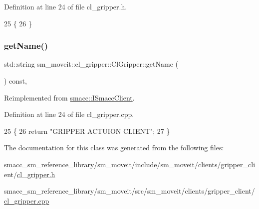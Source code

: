 Definition at line 24 of file cl\+\_\+gripper.\+h.


\begin{DoxyCode}
25   \{
26   \}
\end{DoxyCode}
\mbox{\label{classsm__moveit_1_1cl__gripper_1_1ClGripper_a71ee172824d9eb24c9a386ea6d8822ea}} 
\subsubsection{\texorpdfstring{get\+Name()}{getName()}}
{\footnotesize\ttfamily std\+::string sm\+\_\+moveit\+::cl\+\_\+gripper\+::\+Cl\+Gripper\+::get\+Name (\begin{DoxyParamCaption}{ }\end{DoxyParamCaption}) const\hspace{0.3cm}{\ttfamily [override]}, {\ttfamily [virtual]}}



Reimplemented from \hyperlink{classsmacc_1_1ISmaccClient_a8c3ce19f182e71909c5dc6263d25be69}{smacc\+::\+I\+Smacc\+Client}.



Definition at line 24 of file cl\+\_\+gripper.\+cpp.


\begin{DoxyCode}
25 \{
26     \textcolor{keywordflow}{return} \textcolor{stringliteral}{"GRIPPER ACTUION CLIENT"};
27 \}
\end{DoxyCode}


The documentation for this class was generated from the following files\+:\begin{DoxyCompactItemize}
\item 
smacc\+\_\+sm\+\_\+reference\+\_\+library/sm\+\_\+moveit/include/sm\+\_\+moveit/clients/gripper\+\_\+client/\hyperlink{cl__gripper_8h}{cl\+\_\+gripper.\+h}\item 
smacc\+\_\+sm\+\_\+reference\+\_\+library/sm\+\_\+moveit/src/sm\+\_\+moveit/clients/gripper\+\_\+client/\hyperlink{cl__gripper_8cpp}{cl\+\_\+gripper.\+cpp}\end{DoxyCompactItemize}
